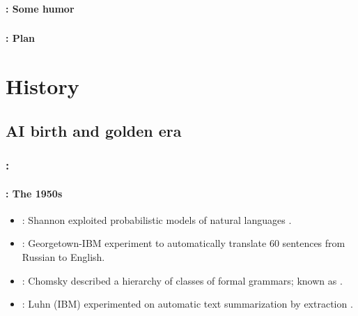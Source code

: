 \documentclass[xcolor=table]{beamer}
\begin{document}
\begin{frame}
	\frametitle{\inserttitle}
	\framesubtitle{\insertshortsubtitle: Some humor}
	
	\begin{center}
	\end{center}

\end{frame}

\begin{frame}
	\frametitle{\inserttitle}
	\framesubtitle{\insertshortsubtitle: Plan}
	
	\begin{multicols}{2}
		\tableofcontents
	\end{multicols}

\end{frame}

\section{History}

\begin{frame}
	\frametitle{\insertshortsubtitle}
	\framesubtitle{\insertsection}


\end{frame}

\subsection{AI birth and golden era}

\begin{frame}
	\frametitle{\insertshortsubtitle: \insertsection}
	\framesubtitle{\insertsubsection: The 1950s}

	\begin{itemize}
		\item {}: Shannon exploited probabilistic models of natural languages \cite{1951-shannon}.
		\item {}: Georgetown-IBM experiment to automatically translate 60 sentences from Russian to English.
		\item {}: Chomsky described a hierarchy of classes of formal grammars; known as .
		\item {}: Luhn (IBM) experimented on automatic text summarization by extraction \cite{1958-luhn}.
	\end{itemize}

\end{frame}
\end{document}

